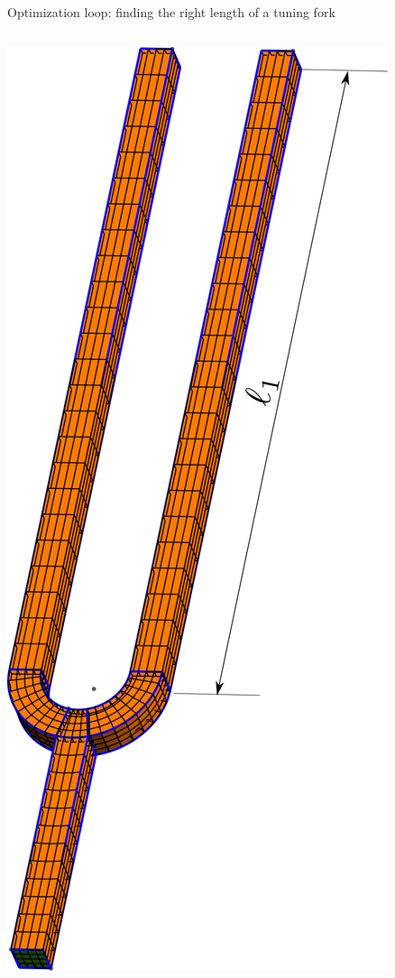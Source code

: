 \documentclass[
  ignorenonframetext,
  aspectratio=169,
]{beamer}
\begin{document}
\begin{frame}[fragile]{Optimization loop: finding the right length of a
tuning fork}
\protect\hypertarget{optimization-loop-finding-the-right-length-of-a-tuning-fork}{}
\begin{columns}[T]
\begin{column}{0.2\textwidth}
\centering \includegraphics{fork-meshed.svg}


\end{column}
\end{columns}
\end{frame}
\end{document}
